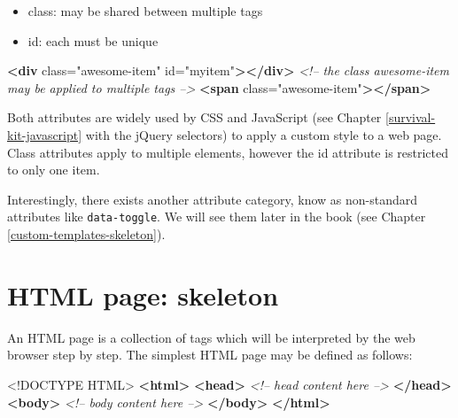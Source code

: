 \documentclass[
]{book}
\newenvironment{Shaded}{\begin{snugshade}}{\end{snugshade}}
\newcommand{\CommentTok}[1]{\textcolor[rgb]{0.56,0.35,0.01}{\textit{#1}}}
\newcommand{\DataTypeTok}[1]{\textcolor[rgb]{0.13,0.29,0.53}{#1}}
\newcommand{\KeywordTok}[1]{\textcolor[rgb]{0.13,0.29,0.53}{\textbf{#1}}}
\newcommand{\NormalTok}[1]{#1}
\newcommand{\OtherTok}[1]{\textcolor[rgb]{0.56,0.35,0.01}{#1}}
\newcommand{\StringTok}[1]{\textcolor[rgb]{0.31,0.60,0.02}{#1}}
\providecommand{\tightlist}{%
  \setlength{\itemsep}{0pt}\setlength{\parskip}{0pt}}
\begin{document}
\begin{itemize}
\tightlist
\item
  class: may be shared between multiple tags
\item
  id: each must be unique
\end{itemize}

\begin{Shaded}
\begin{Highlighting}[]
\KeywordTok{<div}\OtherTok{ class=}\StringTok{"awesome-item"}\OtherTok{ id=}\StringTok{"myitem"}\KeywordTok{></div>}
\CommentTok{<!-- the class awesome-item may be applied to multiple tags -->}
\KeywordTok{<span}\OtherTok{ class=}\StringTok{"awesome-item"}\KeywordTok{></span>}
\end{Highlighting}
\end{Shaded}

Both attributes are widely used by CSS and JavaScript (see Chapter \ref{survival-kit-javascript} with the jQuery selectors) to apply a custom style to a web page. Class attributes apply to multiple elements, however the id attribute is restricted to only one item.

Interestingly, there exists another attribute category, know as non-standard attributes like \texttt{data-toggle}. We will see them later in the book (see Chapter \ref{custom-templates-skeleton}).

\hypertarget{html-page-skeleton}{%
\section{HTML page: skeleton}\label{html-page-skeleton}}

An HTML page is a collection of tags which will be interpreted by the web browser step by step. The simplest HTML page may be defined as follows:

\begin{Shaded}
\begin{Highlighting}[]
\DataTypeTok{<!DOCTYPE }\NormalTok{HTML}\DataTypeTok{>}
\KeywordTok{<html>}
  \KeywordTok{<head>}
  \CommentTok{<!-- head content here -->}
  \KeywordTok{</head>}
  \KeywordTok{<body>}
  \CommentTok{<!-- body content here -->}
  \KeywordTok{</body>}
\KeywordTok{</html>}
\end{Highlighting}
\end{Shaded}
\end{document}

